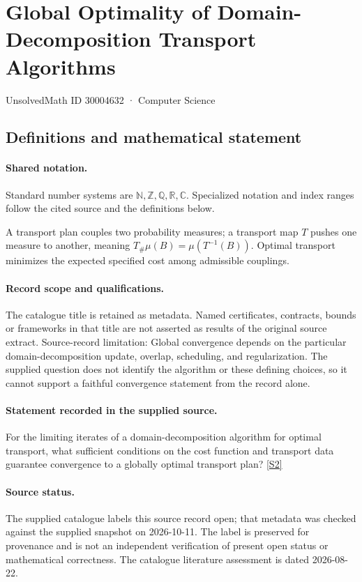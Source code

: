 \documentclass[11pt]{article}
\newcommand{\sref}[2]{\hyperlink{source:#1:#2}{[S#2]}}
\begin{document}
\setcounter{section}{30004631}
\section{Global Optimality of Domain-Decomposition Transport Algorithms}\label{30004632}
{\small\sffamily UnsolvedMath ID 30004632 · Computer Science}
\subsection{Definitions and mathematical statement}

\paragraph{Shared notation.}Standard number systems are $\mathbb N,\mathbb Z,\mathbb Q,\mathbb R,\mathbb C$. Specialized notation and index ranges follow the cited source and the definitions below.


A transport plan couples two probability measures; a transport map $T$ pushes one measure to another, meaning $T_\#\mu(B)=\mu(T^{-1}(B))$. Optimal transport minimizes the expected specified cost among admissible couplings.
\paragraph{Record scope and qualifications.}
The catalogue title is retained as metadata. Named certificates, contracts, bounds or frameworks in that title are not asserted as results of the original source extract.
Source-record limitation: Global convergence depends on the particular domain-decomposition update, overlap, scheduling, and regularization. The supplied question does not identify the algorithm or these defining choices, so it cannot support a faithful convergence statement from the record alone.
\paragraph{Statement recorded in the supplied source.}
For the limiting iterates of a domain-decomposition algorithm for optimal transport, what sufficient conditions on the cost function and transport data guarantee convergence to a globally optimal transport plan? \sref{30004632}{2}
\paragraph{Source status.}
The supplied catalogue labels this source record open; that metadata was checked against the supplied snapshot on 2026-10-11. The label is preserved for provenance and is not an independent verification of present open status or mathematical correctness. The catalogue literature assessment is dated 2026-08-22.
\end{document}
